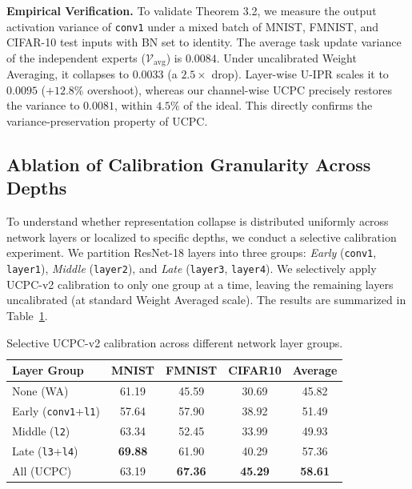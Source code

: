 \documentclass{article}
\theoremstyle{plain}
\theoremstyle{definition}
\theoremstyle{remark}
\begin{document}
\textbf{Empirical Verification.} To validate Theorem 3.2, we measure the output activation variance of \texttt{conv1} under a mixed batch of MNIST, FMNIST, and CIFAR-10 test inputs with BN set to identity. The average task update variance of the independent experts ($\mathcal{V}_{\text{avg}}$) is $0.0084$. Under uncalibrated Weight Averaging, it collapses to $0.0033$ (a $2.5\times$ drop). Layer-wise U-IPR scales it to $0.0095$ ($+12.8\%$ overshoot), whereas our channel-wise UCPC precisely restores the variance to $0.0081$, within $4.5\%$ of the ideal. This directly confirms the variance-preservation property of UCPC.

\subsection{Ablation of Calibration Granularity Across Depths}
To understand whether representation collapse is distributed uniformly across network layers or localized to specific depths, we conduct a selective calibration experiment. We partition ResNet-18 layers into three groups: \textit{Early} (\texttt{conv1}, \texttt{layer1}), \textit{Middle} (\texttt{layer2}), and \textit{Late} (\texttt{layer3}, \texttt{layer4}). We selectively apply UCPC-v2 calibration to only one group at a time, leaving the remaining layers uncalibrated (at standard Weight Averaged scale). The results are summarized in Table~\ref{tab:selective_granularity}.

\begin{table}[tb]
  \centering
  \vspace{-8pt}
  \caption{Selective UCPC-v2 calibration across different network layer groups.}
  \label{tab:selective_granularity}
  \vskip 0.01in
  \begin{small}
    \begin{sc}
      \setlength{\tabcolsep}{2.2pt}
      \begin{tabular}{lcccc}
        \toprule
        Layer Group & MNIST & FMNIST & CIFAR10 & Average \\
        \midrule
        None (WA) & 61.19 & 45.59 & 30.69 & 45.82 \\
        Early (\texttt{conv1}+\texttt{l1}) & 57.64 & 57.90 & 38.92 & 51.49 \\
        Middle (\texttt{l2}) & 63.34 & 52.45 & 33.99 & 49.93 \\
        Late (\texttt{l3}+\texttt{l4}) & \textbf{69.88} & 61.90 & 40.29 & 57.36 \\
        All (UCPC) & 63.19 & \textbf{67.36} & \textbf{45.29} & \textbf{58.61} \\
        \bottomrule
      \end{tabular}
    \end{sc}
  \end{small}
  \vspace{-15pt}
\end{table}
\end{document}
